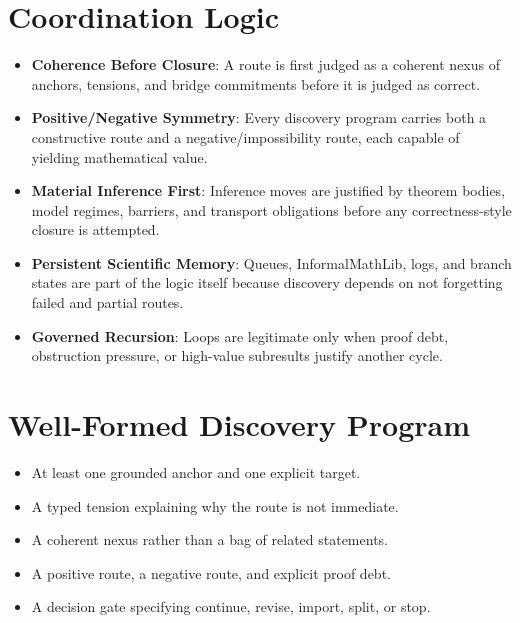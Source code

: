 \documentclass[11pt]{article}
\begin{document}
\section{Coordination Logic}
\begin{itemize}[leftmargin=*,itemsep=0.25em]
\item \textbf{Coherence Before Closure}: A route is first judged as a coherent nexus of anchors, tensions, and bridge commitments before it is judged as correct.
\item \textbf{Positive/Negative Symmetry}: Every discovery program carries both a constructive route and a negative/impossibility route, each capable of yielding mathematical value.
\item \textbf{Material Inference First}: Inference moves are justified by theorem bodies, model regimes, barriers, and transport obligations before any correctness-style closure is attempted.
\item \textbf{Persistent Scientific Memory}: Queues, InformalMathLib, logs, and branch states are part of the logic itself because discovery depends on not forgetting failed and partial routes.
\item \textbf{Governed Recursion}: Loops are legitimate only when proof debt, obstruction pressure, or high-value subresults justify another cycle.
\end{itemize}
\section{Well-Formed Discovery Program}
\begin{itemize}[leftmargin=*,itemsep=0.25em]
\item At least one grounded anchor and one explicit target.
\item A typed tension explaining why the route is not immediate.
\item A coherent nexus rather than a bag of related statements.
\item A positive route, a negative route, and explicit proof debt.
\item A decision gate specifying continue, revise, import, split, or stop.
\end{itemize}
\end{document}
